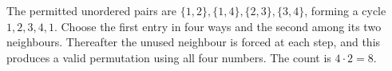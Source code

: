 The permitted unordered pairs are $\{1,2\},\{1,4\},\{2,3\},\{3,4\}$, forming a cycle $1,2,3,4,1$. Choose the first entry in four ways and the second among its two neighbours. Thereafter the unused neighbour is forced at each step, and this produces a valid permutation using all four numbers. The count is $4\cdot2=\boxed8$.
